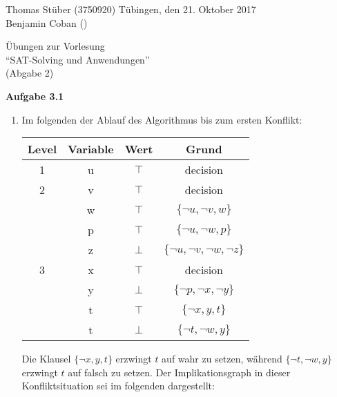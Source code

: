 \documentclass[a4paper,10pt]{article}
\title{}
\author{}
\begin{document}
\noindent Thomas Stüber (3750920) \hfill Tübingen, den  21. Oktober 2017\\
\noindent Benjamin Coban () \\
\begin{center}
\Large Übungen zur Vorlesung  \\ ``SAT-Solving und Anwendungen'' \\
\vspace*{2mm}
\large (Abgabe 2) \\
\vspace*{2mm}
\end{center}

\noindent\textbf{Aufgabe 3.1}\\\smallskip
\begin{enumerate}
\item Im folgenden der Ablauf des Algorithmus bis zum ersten Konflikt:
\begin{center}
\begin{tabular}{|c|c|c|c|}
\hline 
\rule[-1ex]{0pt}{2.5ex} Level & Variable & Wert & Grund \\ 
\hline 
\rule[-1ex]{0pt}{2.5ex} 1 & u & $\top$ & decision \\ 
\hline 
\rule[-1ex]{0pt}{2.5ex} 2 & v & $\top$ & decision \\ 
\hline 
\rule[-1ex]{0pt}{2.5ex}  & w & $\top$ & $\{\neg u, \neg v, w\}$ \\ 
\hline 
\rule[-1ex]{0pt}{2.5ex}  & p & $\top$ & $\{\neg u, \neg w, p\}$ \\ 
\hline 
\rule[-1ex]{0pt}{2.5ex}  & z & $\bot$ & $\{\neg u, \neg v, \neg w, \neg z\}$ \\ 
\hline 
\rule[-1ex]{0pt}{2.5ex} 3 & x & $\top$ & decision \\ 
\hline 
\rule[-1ex]{0pt}{2.5ex}  & y & $\bot$ & $\{\neg p, \neg x, \neg y\}$ \\ 
\hline 
\rule[-1ex]{0pt}{2.5ex}  & t & $\top$ & $\{\neg x, y, t\}$ \\ 
\hline 
\rule[-1ex]{0pt}{2.5ex}  & t & $\bot$ & $\{\neg t, \neg w, y\}$ \\ 
\hline 
\end{tabular}
\end{center}
Die Klausel $\{\neg x, y, t\}$ erzwingt $t$ auf wahr zu setzen, während $\{\neg t, \neg w, y\}$ erzwingt $t$ auf falsch zu setzen. Der Implikationsgraph in dieser Konfliktsituation sei im folgenden dargestellt:
\begin{center}
\begin{tikzpicture}[scale=0.2]

\end{tikzpicture}
\end{center}
\end{enumerate}
\end{document}
